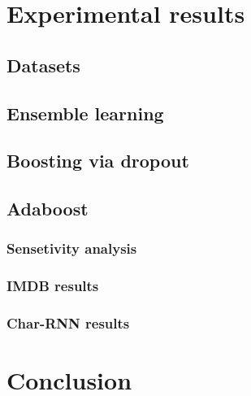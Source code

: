 \documentclass[a4paper,12pt]{article}
\begin{document}


\section{Experimental results}

\subsection{Datasets}

\subsection{Ensemble learning}

\subsection{Boosting via dropout}

\subsection{Adaboost}
\subsubsection{Sensetivity analysis}

\subsubsection{IMDB results}


\subsubsection{Char-RNN results}




\section{Conclusion}
\label{sec:conclusion}



{\small


}
\end{document}
